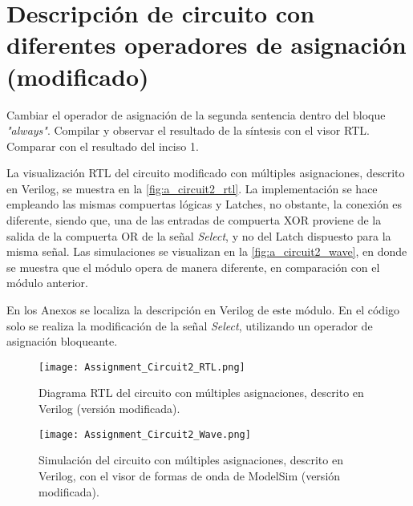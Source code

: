 \section{Descripción de circuito con diferentes operadores de asignación (modificado) \label{sec:s2}}

\begin{center}
	\begin{minipage}{12cm}
		\begin{tcolorbox}[title=Actividad 2]
			Cambiar el operador de asignación de la segunda sentencia dentro del bloque \textit{"always"}. Compilar y observar el resultado de la síntesis con el visor RTL. Comparar con el resultado del inciso 1.
		\end{tcolorbox}	
	\end{minipage}
\end{center}

La visualización RTL del circuito modificado con múltiples asignaciones, descrito en Verilog, se muestra en la \autoref{fig:a_circuit2_rtl}. La implementación se hace empleando las mismas compuertas lógicas y Latches, no obstante, la conexión es diferente, siendo que, una de las entradas de compuerta XOR proviene de la salida de la compuerta OR de la señal \textit{Select}, y no del Latch dispuesto para la misma señal. Las simulaciones se visualizan en la \autoref{fig:a_circuit2_wave}, en donde se muestra que el módulo opera de manera diferente, en comparación con el módulo anterior.

En los Anexos se localiza la descripción en Verilog de este módulo. En el código solo se realiza la modificación de la señal \textit{Select}, utilizando un operador de asignación bloqueante.

\begin{figure}[ht]
	\centering
	\texttt{[image: Assignment\_Circuit2\_RTL.png]}
	\caption{Diagrama RTL del circuito con múltiples asignaciones, descrito en Verilog (versión modificada). \label{fig:a_circuit2_rtl}}
\end{figure}

\begin{figure}[ht]
	\centering
	\texttt{[image: Assignment\_Circuit2\_Wave.png]}
	\caption{Simulación del circuito con múltiples asignaciones, descrito en Verilog, con el visor de formas de onda de ModelSim (versión modificada). \label{fig:a_circuit2_wave}}
\end{figure}